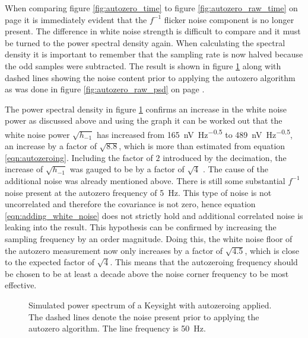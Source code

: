 When comparing figure \ref{fig:autozero_time} to figure \ref{fig:autozero_raw_time} on page \pageref{fig:autozero_raw_time} it is immediately evident that the $f^{-1}$ flicker noise component is no longer present. The difference in white noise strength is difficult to compare and it must be turned to the power spectral density again. When calculating the spectral density it is important to remember that the sampling rate is now halved because the odd samples were subtracted. The result is shown in figure \ref{fig:autozero_psd} along with dashed lines showing the noise content prior to applying the autozero algorithm as was done in figure \ref{fig:autozero_raw_psd} on page \pageref{fig:autozero_raw_psd}.

The power spectral density in figure \ref{fig:autozero_psd} confirms an increase in the white noise power as discussed above and using the graph it can be worked out that the white noise power $\sqrt{h_{-1}}$ has increased from \qty[power-half-as-sqrt, per-mode=symbol]{165}{\nV \Hz\tothe{-0.5}} to \qty[power-half-as-sqrt, per-mode=symbol]{489}{\nV \Hz\tothe{-0.5}}, an increase by a factor of $\sqrt{8.8}$, which is more than estimated from equation \ref{eqn:autozeroing}. Including the factor of $2$ introduced by the decimation, the increase of $\sqrt{h_{-1}}$ was gauged to be by a factor of $\sqrt{4}$ . The cause of the additional noise was already mentioned above. There is still some substantial $f^{-1}$ noise present at the autozero frequency of \qty{5}{\Hz}. This type of noise is not uncorrelated and therefore the covariance is not zero, hence equation \ref{eqn:adding_white_noise} does not strictly hold and additional correlated noise is leaking into the result. This hypothesis can be confirmed by increasing the sampling frequency by an order magnitude. Doing this, the white noise floor of the autozero measurement now only increases by a factor of $\sqrt{4.5}$, which is close to the expected factor of $\sqrt{4}$. This means that the autozeroing frequency should be chosen to be at least a decade above the noise corner frequency to be most effective.
\begin{figure}[ht]
    \centering
    \caption{Simulated power spectrum of a Keysight  with autozeroing applied. The dashed lines denote the noise present prior to applying the autozero algorithm. The line frequency is \qty{50}{\Hz}.}
    \label{fig:autozero_psd}
\end{figure}

